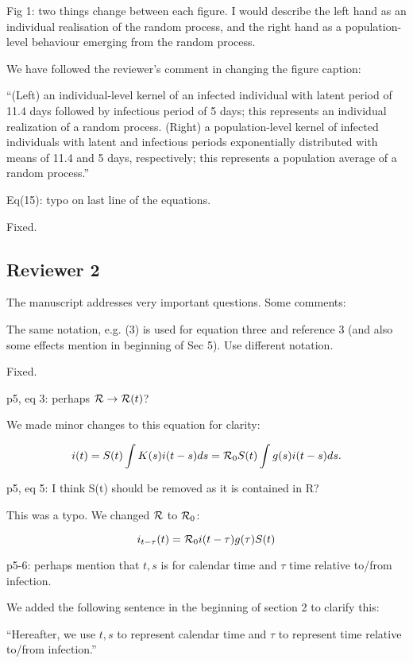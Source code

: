 \documentclass[12pt]{article}
\newcommand{\RR}{\ensuremath{{\cal R}}}
\newcommand{\rev}{\subsection*}
\newcommand{\revtext}{\textsf}
\begin{document}
\revtext{Fig 1: two things change between each figure. I would describe the left hand as an individual realisation of the random process, and the right hand as a population-level behaviour emerging from the random process.}

We have followed the reviewer's comment in changing the figure caption:

``(Left) an individual-level kernel of an infected individual with latent period of 11.4 days followed by infectious period of 5 days;
this represents an individual realization of a random process.
(Right) a population-level kernel of infected individuals with latent and infectious periods exponentially distributed with means of 11.4 and 5 days, respectively;
this represents a population average of a random process.''

\revtext{Eq(15): typo on last line of the equations.}

Fixed.

\rev{Reviewer 2}

\revtext{The manuscript addresses very important questions. Some comments:}

\revtext{The same notation, e.g. (3) is used for equation three and reference 3 (and also some effects mention in beginning of Sec 5). Use different notation.}

Fixed.

\revtext{p5, eq 3: perhaps $\RR \rightarrow \RR(t)$?}

We made minor changes to this equation for clarity:

\begin{equation*}
i(t) = S(t) \int K(s) i(t-s) ds = \RR_0 S(t) \int g(s) i(t-s) ds.
\end{equation*}

\revtext{p5, eq 5: I think S(t) should be removed as it is contained in R?}

This was a typo. We changed $\RR$ to $\RR_0$:

\begin{equation*}
i_{t-\tau}(t) = \RR_0 i(t-\tau) g(\tau) S(t)
\end{equation*}

\revtext{p5-6: perhaps mention that $t, s$ is for calendar time and $\tau$ time relative to/from infection.}

We added the following sentence in the beginning of section 2 to clarify this:

``Hereafter, we use $t, s$ to represent calendar time and $\tau$ to represent time relative to/from infection.''
\end{document}
